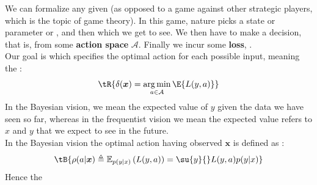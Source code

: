 We can formalize any given  (as 
opposed to a game against other strategic players, which is the topic of game theory).
In this game, nature picks a state or parameter or , and then  which we get to see. We
then have to make a decision, that is,  from some 
\textbf{action space} $\mathcal{A}$. Finally we incur some \textbf{loss}, .\\
Our goal is  which specifies the optimal
action for each possible input, meaning the :
$$ \tR{\delta(\bm{x}) = \argmin_{{a\in \mathcal{A}}} \E{{L(y, a)}}} $$
In the Bayesian vision, we mean the expected value of $y$ given the data we have seen so far, 
whereas in the frequentist vision we mean the expected value refers to $x$ and $y$ that we expect
to see in the future.\\
In the Bayesian vision the optimal action having observed $\bm{x}$ is defined as 
:
$$ \tB{\rho(a|\bm{x})\triangleq\mathbb{E}_{p(y|x)}\left(L(y, a)\right) = \su{y}{}L(y,
a) p(y|x)}$$
Hence the 


